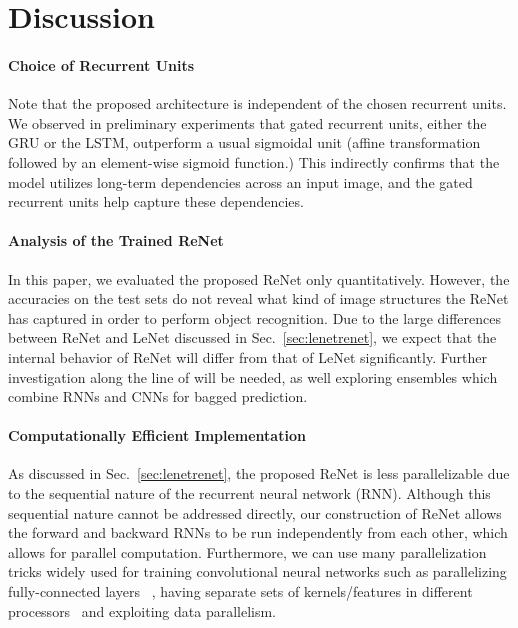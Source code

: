 \section{Discussion}

\paragraph{Choice of Recurrent Units}
Note that the proposed architecture is independent of the chosen recurrent
units. We observed in preliminary experiments that gated
recurrent units, either the GRU or the LSTM, outperform a usual sigmoidal unit
(affine transformation followed by an element-wise sigmoid function.) This
indirectly confirms that the model utilizes long-term dependencies across an
input image, and the gated recurrent units help capture these dependencies.

\paragraph{Analysis of the Trained ReNet}
In this paper, we evaluated the proposed ReNet only quantitatively. However, the
accuracies on the test sets do not reveal what kind of image structures the
ReNet has captured in order to perform object recognition. Due to the large
differences between ReNet and LeNet discussed in
Sec.~\ref{sec:lenetrenet}, we expect that the internal behavior of ReNet
will differ from that of LeNet significantly. Further investigation along
the line of \citep{ZeilerFergus14} will be needed, as well exploring ensembles
which combine RNNs and CNNs for bagged prediction.

\paragraph{Computationally Efficient Implementation}
As discussed in Sec.~\ref{sec:lenetrenet}, the proposed ReNet is less
parallelizable due to the sequential nature of the recurrent neural network
(RNN). Although this sequential nature cannot be addressed directly, our
construction of ReNet allows the forward and backward RNNs to be run
independently from each other, which allows for parallel computation.
Furthermore, we can use many parallelization tricks widely used for training
convolutional neural networks such as parallelizing fully-connected layers
~\citep{krizhevsky2014one}, having separate sets of kernels/features in
different processors~\citep{Krizhevsky-2012} and exploiting data parallelism.

